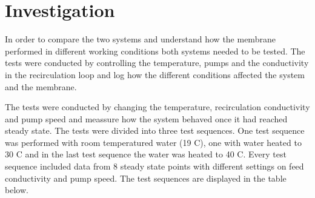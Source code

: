 \newpage

\section{Investigation}

In order to compare the two systems and understand how the membrane performed in different working conditions both systems needed to be tested. The tests were conducted by controlling the temperature, pumps and the conductivity in the recirculation loop and log how the different conditions affected the system and the membrane. 

The tests were conducted by changing the temperature, recirculation conductivity and pump speed and meassure how the system behaved once it had reached steady state. The tests were divided into three test sequences. One test sequence was performed with room temperatured water (19 C), one with water heated to 30 C and in the last test sequence the water was heated to 40 C. Every test sequence included data from 8 steady state points with different settings on feed conductivity and pump speed. The test sequences are displayed in the table below. 


